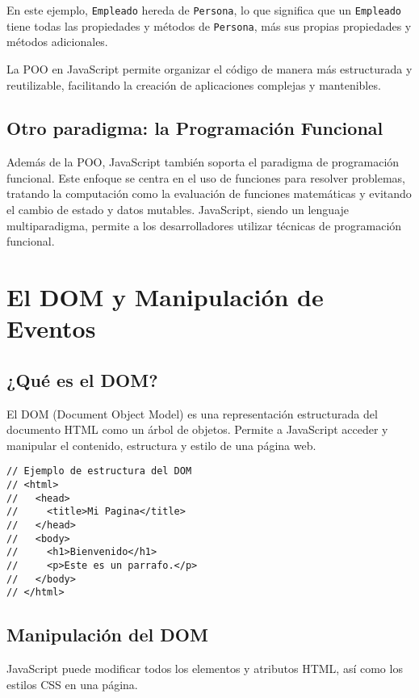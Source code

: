\documentclass{book}
\begin{document}
En este ejemplo, \texttt{Empleado} hereda de \texttt{Persona}, lo que significa que un \texttt{Empleado} tiene todas las propiedades y métodos de \texttt{Persona}, más sus propias propiedades y métodos adicionales.

La POO en JavaScript permite organizar el código de manera más estructurada y reutilizable, facilitando la creación de aplicaciones complejas y mantenibles.

\subsection{Otro paradigma: la Programación Funcional}

Además de la POO, JavaScript también soporta el paradigma de programación funcional. Este enfoque se centra en el uso de funciones para resolver problemas, tratando la computación como la evaluación de funciones matemáticas y evitando el cambio de estado y datos mutables. JavaScript, siendo un lenguaje multiparadigma, permite a los desarrolladores utilizar técnicas de programación funcional.

\section{El DOM y Manipulación de Eventos}

\subsection{¿Qué es el DOM?}

El DOM (Document Object Model) es una representación estructurada del documento HTML como un árbol de objetos. Permite a JavaScript acceder y manipular el contenido, estructura y estilo de una página web.

\begin{lstlisting}[language=HTML5]
// Ejemplo de estructura del DOM
// <html>
//   <head>
//     <title>Mi Pagina</title>
//   </head>
//   <body>
//     <h1>Bienvenido</h1>
//     <p>Este es un parrafo.</p>
//   </body>
// </html>
\end{lstlisting}

\subsection{Manipulación del DOM}

JavaScript puede modificar todos los elementos y atributos HTML, así como los estilos CSS en una página.
\end{document}
